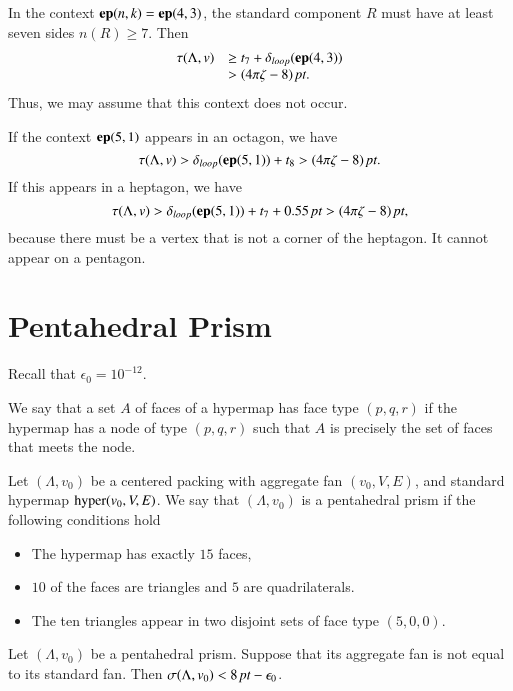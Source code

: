 In the context ${\operatorname{\bf ep}}{(n,k)}={\operatorname{\bf ep}}{(4,3)}$, the standard component $R$ must have at
least seven sides $n(R)\ge7$.   Then
    $$
    \begin{array}{lll}
    \tau(\Lambda,v)&\ge t_7+{\delta}_{loop}({\operatorname{\bf ep}}{(4,3)})\\
            &>(4\pi\zeta-8)\,\hbox{\it pt}.
    \end{array}
    $$
Thus, we may assume that this context does not occur.

If the context ${\operatorname{\bf ep}}{(5,1)}$ appears in an octagon, we have
    $$\tau(\Lambda,v) >{\delta}_{loop}({\operatorname{\bf ep}}{(5,1)})+t_8>(4\pi\zeta-8)\,\hbox{\it pt}.$$
If this appears in a heptagon, we have
$$\tau(\Lambda,v) >{\delta}_{loop}({\operatorname{\bf ep}}{(5,1)}) + t_7+ 0.55\,\hbox{\it pt} > (4\pi\zeta-8)\,\hbox{\it pt},$$
because there must be a vertex that is not a corner of the
heptagon. It cannot appear on a pentagon.








\section{Pentahedral Prism}

Recall that $\epsilon_0 = 10^{-12}$.

\begin{definition}[type,~$(p,q,r)$]
We say that a set $A$ of faces of a hypermap has face type $(p,q,r)$ if
the hypermap has a node of type $(p,q,r)$ such that $A$ is precisely the
set of faces that meets the node.
\end{definition}


\begin{definition}
Let $(\Lambda,v_0)$ be a centered packing with aggregate fan $(v_0,V,E)$,
and standard hypermap ${\operatorname{hyper}}(v_0,V,E)$.
We say that $(\Lambda,v_0)$ is a pentahedral prism if the following conditions hold 
  \begin{itemize}
   \item The hypermap has exactly $15$ faces, 
   \item  $10$ of the faces are triangles and $5$ are quadrilaterals.
   \item The ten triangles appear in two disjoint sets of face type $(5,0,0)$.
  \end{itemize}
\end{definition}

\begin{lemma}
Let $(\Lambda,v_0)$ be a pentahedral prism.  Suppose that its aggregate
fan is not equal to its standard fan.  Then 
    $\sigma(\Lambda,v_0) < 8\,\hbox{\it pt} - \epsilon_0$.
\end{lemma}

